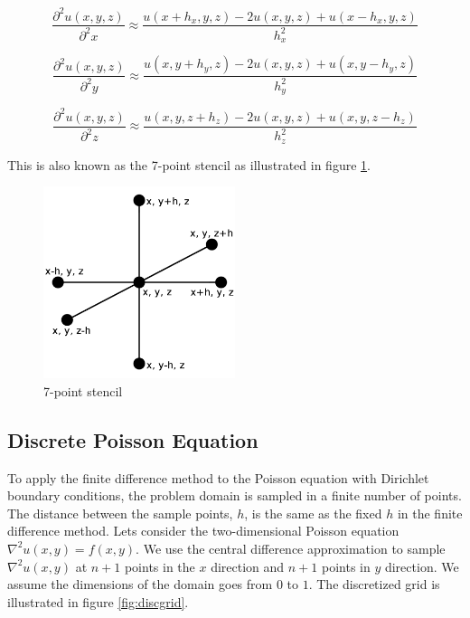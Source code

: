 $$\frac{\partial^2 u(x, y, z)}{\partial^2 x} \approx \frac{u(x+h_x, y, z) - 2u(x, y, z) + u(x-h_x, y, z)}{h_x^2}$$

$$\frac{\partial^2 u(x, y, z)}{\partial^2 y} \approx \frac{u(x, y+h_y, z) - 2u(x, y, z) + u(x, y-h_y, z)}{h_y^2}$$

$$\frac{\partial^2 u(x, y, z)}{\partial^2 z} \approx \frac{u(x, y, z+h_z) - 2u(x, y, z) + u(x, y, z-h_z)}{h_z^2}$$

This is also known as the 7-point stencil as illustrated in figure \ref{fig:7ps}.

\begin{figure}[ht]
	\center
	\includegraphics[width=0.5\textwidth]{images/7_point_stencil}
	\caption{7-point stencil}
	\label{fig:7ps}
\end{figure}

\subsection{Discrete Poisson Equation}

To apply the finite difference method to the Poisson equation with Dirichlet 
boundary conditions, the problem domain is sampled in a finite number of points. 
The distance between the sample points, $h$, is the same as the fixed $h$ in the finite
difference method. Lets consider the two-dimensional Poisson equation $\nabla^2
u(x, y) = f(x, y)$. We use the central difference approximation to sample
$\nabla^2 u(x, y)$ at $n+1$ points in the $x$ direction and $n+1$ points in $y$
direction. We assume the dimensions of the domain goes from $0$ to $1$. The discretized 
grid is illustrated in figure \ref{fig:discgrid}.

